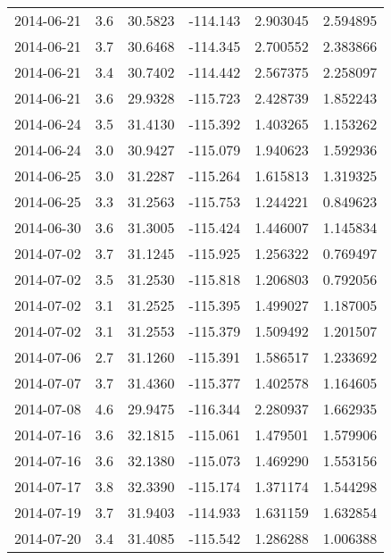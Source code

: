 \begin{tabular}{lrrrrr}
2014-06-21 &       3.6 &  30.5823 &  -114.143 &         2.903045 &         2.594895 \\
2014-06-21 &       3.7 &  30.6468 &  -114.345 &         2.700552 &         2.383866 \\
2014-06-21 &       3.4 &  30.7402 &  -114.442 &         2.567375 &         2.258097 \\
2014-06-21 &       3.6 &  29.9328 &  -115.723 &         2.428739 &         1.852243 \\
2014-06-24 &       3.5 &  31.4130 &  -115.392 &         1.403265 &         1.153262 \\
2014-06-24 &       3.0 &  30.9427 &  -115.079 &         1.940623 &         1.592936 \\
2014-06-25 &       3.0 &  31.2287 &  -115.264 &         1.615813 &         1.319325 \\
2014-06-25 &       3.3 &  31.2563 &  -115.753 &         1.244221 &         0.849623 \\
2014-06-30 &       3.6 &  31.3005 &  -115.424 &         1.446007 &         1.145834 \\
2014-07-02 &       3.7 &  31.1245 &  -115.925 &         1.256322 &         0.769497 \\
2014-07-02 &       3.5 &  31.2530 &  -115.818 &         1.206803 &         0.792056 \\
2014-07-02 &       3.1 &  31.2525 &  -115.395 &         1.499027 &         1.187005 \\
2014-07-02 &       3.1 &  31.2553 &  -115.379 &         1.509492 &         1.201507 \\
2014-07-06 &       2.7 &  31.1260 &  -115.391 &         1.586517 &         1.233692 \\
2014-07-07 &       3.7 &  31.4360 &  -115.377 &         1.402578 &         1.164605 \\
2014-07-08 &       4.6 &  29.9475 &  -116.344 &         2.280937 &         1.662935 \\
2014-07-16 &       3.6 &  32.1815 &  -115.061 &         1.479501 &         1.579906 \\
2014-07-16 &       3.6 &  32.1380 &  -115.073 &         1.469290 &         1.553156 \\
2014-07-17 &       3.8 &  32.3390 &  -115.174 &         1.371174 &         1.544298 \\
2014-07-19 &       3.7 &  31.9403 &  -114.933 &         1.631159 &         1.632854 \\
2014-07-20 &       3.4 &  31.4085 &  -115.542 &         1.286288 &         1.006388 \\

\end{tabular}
